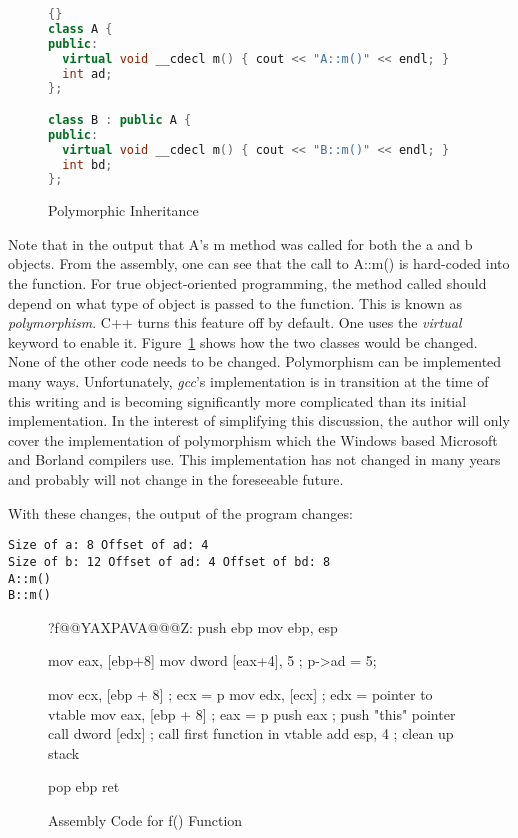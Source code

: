 \begin{figure}[tp]
\begin{lstlisting}[language=C++, frame=tlrb]{}
class A {
public:
  virtual void __cdecl m() { cout << "A::m()" << endl; }
  int ad;
};

class B : public A {
public:
  virtual void __cdecl m() { cout << "B::m()" << endl; }
  int bd;
};
\end{lstlisting}
\caption{ Polymorphic Inheritance \label{fig:VirtInh}}
\end{figure}

Note that in the output that {\code A}'s {\code m} method was called
for both the {\code a} and {\code b} objects. From the assembly, one
can see that the call to {\code A::m()} is hard-coded into the
function. For true object-oriented programming, the method called
should depend on what type of object is passed to the function. This
is known as \emph{polymorphism}. C++ turns this feature off by
default. One uses the \emph{virtual}  keyword to enable
it. Figure~\ref{fig:VirtInh} shows how the two classes would be
changed. None of the other code needs to be changed.  Polymorphism can
be implemented many ways. Unfortunately, \emph{gcc}'s implementation
is in transition at the time of this writing and is becoming
significantly more complicated than its initial implementation.  In
the interest of simplifying this discussion, the author will only
cover the implementation of polymorphism which the Windows based
Microsoft and Borland compilers use. This implementation has not
changed in many years and probably will not change in the foreseeable
future. 

With these changes, the output of the program changes:
\begin{verbatim}
Size of a: 8 Offset of ad: 4
Size of b: 12 Offset of ad: 4 Offset of bd: 8
A::m()
B::m()
\end{verbatim}


\begin{figure}[tp]
\begin{AsmCodeListing}[commentchar=!]
?f@@YAXPAVA@@@Z:
      push   ebp
      mov    ebp, esp

      mov    eax, [ebp+8]
      mov    dword [eax+4], 5  ; p->ad = 5;

      mov    ecx, [ebp + 8]    ; ecx = p
      mov    edx, [ecx]        ; edx = pointer to vtable
      mov    eax, [ebp + 8]    ; eax = p
      push   eax               ; push "this" pointer
      call   dword [edx]       ; call first function in vtable
      add    esp, 4            ; clean up stack

      pop    ebp
      ret
\end{AsmCodeListing}
\caption{Assembly Code for {\code f()} Function \label{fig:FAsm2}}
\end{figure}

